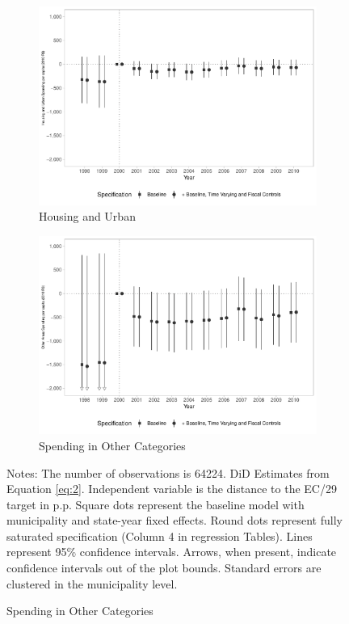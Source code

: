 \begin{figure}[h!]
\begin{center}
\begin{subfigure}{0.48\textwidth}
        \centering
        \caption{\scriptsize Housing and Urban}\label{fig:b2e}
        \includegraphics[width=\textwidth]{plots/finbra_desp_hab_urb_pcapita_dist_ec29_baseline_dist_ec29_baseline_B2.pdf}
    \end{subfigure}
    \begin{subfigure}{0.48\textwidth}
        \centering
        \caption{\scriptsize Spending in Other Categories}\label{fig:b2f}
        \includegraphics[width=\textwidth]{plots/finbra_desp_outros_area_pcapita_dist_ec29_baseline_dist_ec29_baseline_B2.pdf}
    \end{subfigure}
    
    \end{center}
    \scriptsize{Notes: The number of observations is 64224. DiD Estimates from Equation \ref{eq:2}. Independent variable is the distance to the EC/29 target in p.p. Square dots represent the baseline model with municipality and state-year fixed effects. Round dots represent fully saturated specification (Column 4 in regression Tables). Lines represent 95\% confidence intervals. Arrows, when present, indicate confidence intervals out of the plot bounds. Standard errors are clustered in the municipality level.}
    
\end{figure}